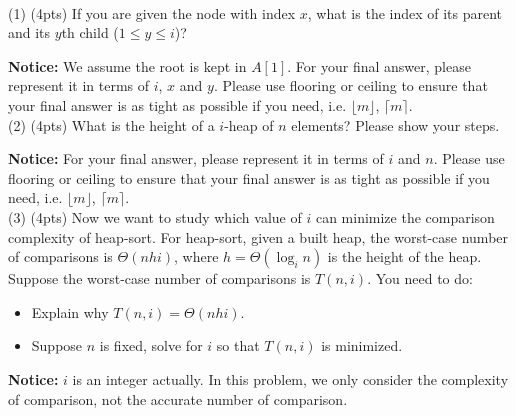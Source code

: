 \documentclass[10.5pt]{article}
\begin{document}
~\\

(1) (4pts) If you are given the node with index $x$, what is the index of its parent and its $y$th child ($1 \leq y \leq i$)?

\textbf{Notice: }We assume the root is kept in $A[1]$. For your final answer, please represent it in terms of $i$, $x$ and $y$. Please use flooring or ceiling to ensure that your final answer is as tight as possible if you need, i.e. $\lfloor m \rfloor$, $\lceil m \rceil$.
~\\


\newpage
(2) (4pts) What is the height of a $i$-heap of $n$ elements? Please show your steps.

\textbf{Notice: }For your final answer, please represent it in terms of $i$ and $n$. Please use flooring or ceiling to ensure that your final answer is as tight as possible if you need, i.e. $\lfloor m \rfloor$, $\lceil m \rceil$.
~\\


\newpage
(3) (4pts) Now we want to study which value of $i$ can minimize the comparison complexity of heap-sort. For heap-sort, given a built heap, the worst-case number of comparisons is $\Theta(nhi)$, where $h=\Theta(\log_in)$ is the height of the heap. Suppose the worst-case number of comparisons is $T(n,i)$. You need to do: 

\begin{itemize}
	\item{Explain why $T(n,i) = \Theta(nhi)$.}
	\item{Suppose $n$ is fixed, solve for $i$ so that $T(n,i)$ is minimized.}
\end{itemize}

\textbf{Notice: } $i$ is an integer actually. In this problem, we only consider the complexity of comparison, not the accurate number of comparison.
\end{document}
